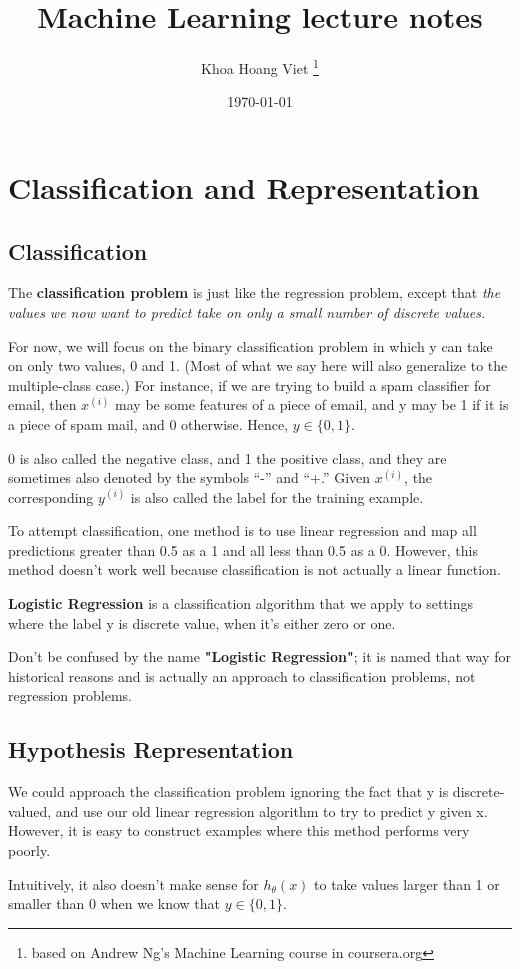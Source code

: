 \documentclass{article}
\title{Machine Learning lecture notes}
\author{Khoa Hoang Viet \thanks{based on Andrew Ng's Machine Learning course in coursera.org}}
\date{\today}
\begin{document}
\section{Classification and Representation}
\subsection{Classification}
The \textbf{classification problem} is just like the regression problem, except that \textit{the values we now want to predict take on only a small number of discrete values.} 

For now, we will focus on the binary classification problem in which y can take on only two values, 0 and 1. (Most of what we say here will also generalize to the multiple-class case.) For instance, if we are trying to build a spam classifier for email, then $x^{(i)}$ may be some features of a piece of email, and y may be 1 if it is a piece of spam mail, and 0 otherwise. Hence, $y \in\{0, 1\}$.

0 is also called the negative class, and 1 the positive class, and they are sometimes also denoted by the symbols “-” and “+.” Given $x^{(i)}$, the corresponding $y^{(i)}$ is also called the label for the training example.

To attempt classification, one method is to use linear regression and map all predictions greater than 0.5 as a 1 and all less than 0.5 as a 0. However, this method doesn't work well because classification is not actually a linear function.

\textbf{Logistic Regression} is a classification algorithm that we apply to settings where the label y is discrete value, when it's either zero or one. 

Don't be confused by the name \textbf{"Logistic Regression"}; it is named that way for historical reasons and is actually an approach to classification problems, not regression problems.


\subsection{Hypothesis Representation}
We could approach the classification problem ignoring the fact that y is discrete-valued, and use our old linear regression algorithm to try to predict y given x. However, it is easy to construct examples where this method performs very poorly.

Intuitively, it also doesn’t make sense for $h_\theta (x)$ to take values larger than 1 or smaller than 0 when we know that $y \in\{0, 1\}$.
\end{document}
